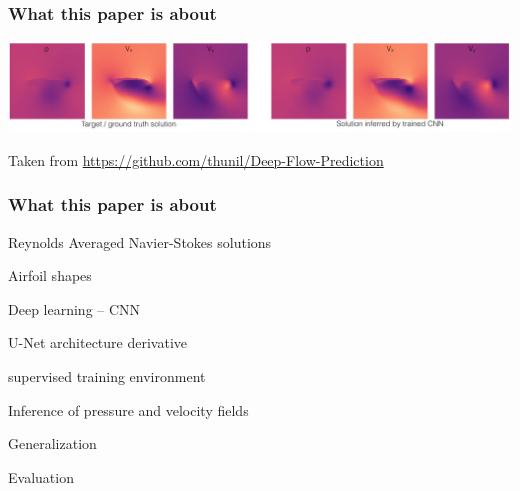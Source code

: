 \begin{frame}
    \frametitle{What this paper is about}
	\vspace*{3cm}
	
	\includegraphics[width=\textwidth, height=.3\textheight]{./Ressourcen/Praesentation/Bilder/teaser.jpg}
	
\vspace*{1cm}	
Taken from \url{https://github.com/thunil/Deep-Flow-Prediction}
	
\end{frame}
\clearpage

\begin{frame}
    \frametitle{What this paper is about}
	\vspace*{0.8cm}
	
\begin{PraesentationAufzaehlung}
	
\item Reynolds Averaged Navier-Stokes solutions 

\item Airfoil shapes

\item Deep learning -- CNN

\item U-Net architecture derivative 

\item supervised training environment

\item Inference of pressure and velocity fields

\item Generalization

\item Evaluation

\end{PraesentationAufzaehlung}


\end{frame}
\clearpage